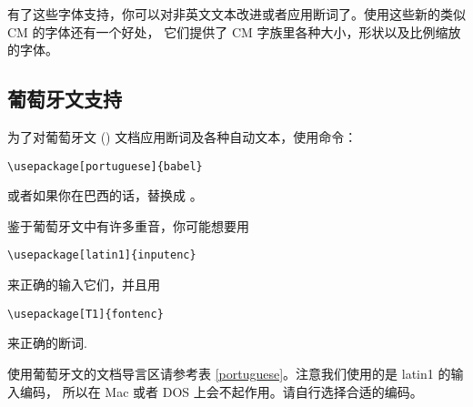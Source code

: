 有了这些字体支持，你可以对非英文文本改进或者应用断词了。使用这些新的类似 CM 的字体还有一个好处，
它们提供了 CM 字族里各种大小，形状以及比例缩放的字体。

\subsection{葡萄牙文支持}

为了对葡萄牙文 () 文档应用断词及各种自动文本，使用命令：
\begin{lscommand}
\verb|\usepackage[portuguese]{babel}|
\end{lscommand}
或者如果你在巴西的话，替换成 \texttt{}。

鉴于葡萄牙文中有许多重音，你可能想要用
\begin{lscommand}
\verb|\usepackage[latin1]{inputenc}|
\end{lscommand}
\noindent 来正确的输入它们，并且用
\begin{lscommand}
\verb|\usepackage[T1]{fontenc}|
\end{lscommand}
\noindent 来正确的断词.

使用葡萄牙文的文档导言区请参考表 \ref{portuguese}。注意我们使用的是 latin1 的输入编码，
所以在 Mac 或者 DOS 上会不起作用。请自行选择合适的编码。

